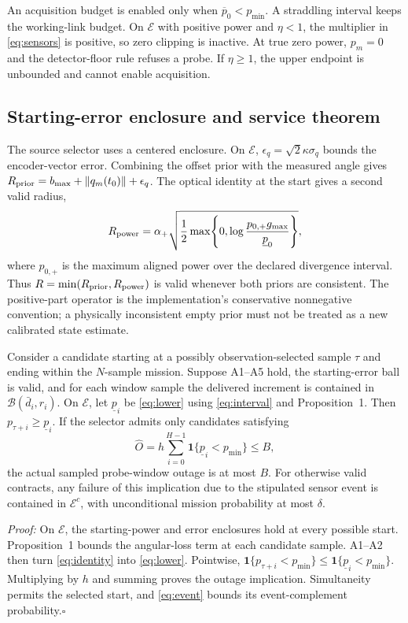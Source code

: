An acquisition budget is enabled only when $\overline p_0<p_{\min}$. A straddling interval keeps the working-link budget. On $\mathcal E$ with positive power and $\eta<1$, the multiplier in \eqref{eq:sensors} is positive, so zero clipping is inactive. At true zero power, $p_m=0$ and the detector-floor rule refuses a probe. If $\eta\geq1$, the upper endpoint is unbounded and cannot enable acquisition.

\subsection{Starting-error enclosure and service theorem}
The source selector uses a centered enclosure. On $\mathcal E$, $\epsilon_q=\sqrt2\kappa\sigma_q$ bounds the encoder-vector error. Combining the offset prior with the measured angle gives $R_{\rm prior}=b_{\max}+\lVert q_m(t_0)\rVert+\epsilon_q$. The optical identity at the start gives a second valid radius,
\begin{equation}
R_{\rm power}=\alpha_+\sqrt{\frac12\max\!\left\{0,\log\frac{p_{0,+}g_{\max}}{\underline p_0}\right\}},
\end{equation}
where $p_{0,+}$ is the maximum aligned power over the declared divergence interval. Thus $R=\min(R_{\rm prior},R_{\rm power})$ is valid whenever both priors are consistent. The positive-part operator is the implementation's conservative nonnegative convention; a physically inconsistent empty prior must not be treated as a new calibrated state estimate.

\begin{theorem}
Consider a candidate starting at a possibly observation-selected sample $\tau$ and ending within the $N$-sample mission. Suppose A1--A5 hold, the starting-error ball is valid, and for each window sample the delivered increment is contained in $\mathcal B(\bar d_i,r_i)$. On $\mathcal E$, let $\underline p_i$ be \eqref{eq:lower} using \eqref{eq:interval} and Proposition~1. Then $p_{\tau+i}\geq\underline p_i$. If the selector admits only candidates satisfying
\begin{equation}
\widehat O=h\sum_{i=0}^{H-1}\mathbf1\{\underline p_i<p_{\min}\}\leq B,
\end{equation}
the actual sampled probe-window outage is at most $B$. For otherwise valid contracts, any failure of this implication due to the stipulated sensor event is contained in $\mathcal E^c$, with unconditional mission probability at most $\delta$.
\end{theorem}
\emph{Proof:} On $\mathcal E$, the starting-power and error enclosures hold at every possible start. Proposition~1 bounds the angular-loss term at each candidate sample. A1--A2 then turn \eqref{eq:identity} into \eqref{eq:lower}. Pointwise, $\mathbf1\{p_{\tau+i}<p_{\min}\}\leq\mathbf1\{\underline p_i<p_{\min}\}$. Multiplying by $h$ and summing proves the outage implication. Simultaneity permits the selected start, and \eqref{eq:event} bounds its event-complement probability.\hfill$\square$

